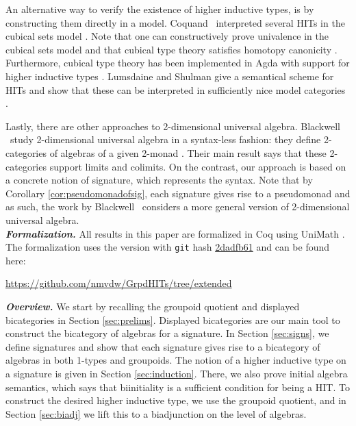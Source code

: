 An alternative way to verify the existence of higher inductive types,
is by constructing them directly in a model.
Coquand \etal \ interpreted several HITs in the cubical sets model \cite{BezemCH13,CoquandHM18}.
Note that one can constructively prove univalence in the cubical sets model \cite{CohenCHM16}
and that cubical type theory satisfies homotopy canonicity \cite{DBLP:conf/rta/CoquandHS19}.
Furthermore, cubical type theory has been implemented in Agda with support for higher inductive types \cite{vezzosi2019cubical}.
Lumsdaine and Shulman give a semantical scheme for HITs and show that these can be interpreted
in sufficiently nice model categories \cite{lumsdaine2017semantics}.

Lastly, there are other approaches to 2-dimensional universal algebra.
Blackwell \etal \ study 2-dimensional universal algebra in a syntax-less fashion: they define 2-categories of algebras of a given 2-monad \cite{blackwell1989two}.
Their main result says that these 2-categories support limits and colimits.
On the contrast, our approach is based on a concrete notion of signature, which represents the syntax.
Note that by Corollary \ref{cor:pseudomonadofsig}, each signature gives rise to a pseudomonad and as such, the work by Blackwell \etal \ considers a more general version of 2-dimensional universal algebra.
\\
\emph{\textbf{Formalization.}}
All results in this paper are formalized in Coq \cite{Coq:manual} using UniMath \cite{UniMath}.
The formalization uses the version with \texttt{git} hash \href{https://github.com/UniMath/UniMath/tree/2dadfb61f5ef0d9805cf0eb6b80ef2beb26472d5}{2dadfb61} and can be found here:
\begin{center}
\url{https://github.com/nmvdw/GrpdHITs/tree/extended}
\end{center}
\emph{\textbf{Overview.}}
We start by recalling the groupoid quotient and displayed bicategories in Section \ref{sec:prelims}.
Displayed bicategories are our main tool to construct the bicategory of algebras for a signature.
In Section \ref{sec:signs}, we define signatures and show that each signature gives rise to a bicategory of algebras in both 1-types and groupoids.
The notion of a higher inductive type on a signature is given in Section \ref{sec:induction}.
There, we also prove initial algebra semantics, which says that biinitiality is a sufficient condition for being a HIT.
To construct the desired higher inductive type, we use the groupoid quotient, and in Section \ref{sec:biadj} we lift this to a biadjunction on the level of algebras.
